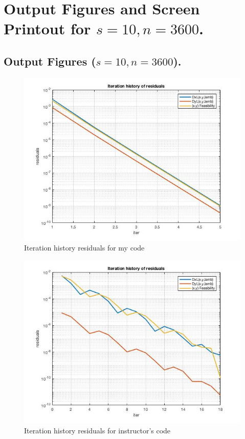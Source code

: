 \clearpage
\section{Output Figures and Screen Printout for $s=10,n=3600$.}
\subsection{Output Figures ($s=10,n=3600$).}
\begin{figure}[H]
\centering
\includegraphics[width=12cm]{F_3/F_1_2.jpg}
\caption{Iteration history residuals for my code}
\end{figure}
\begin{figure}[H]
\centering
\includegraphics[width=12cm]{F_3/F_1_3.jpg}
\caption{Iteration history residuals for instructor's code}
\end{figure}

